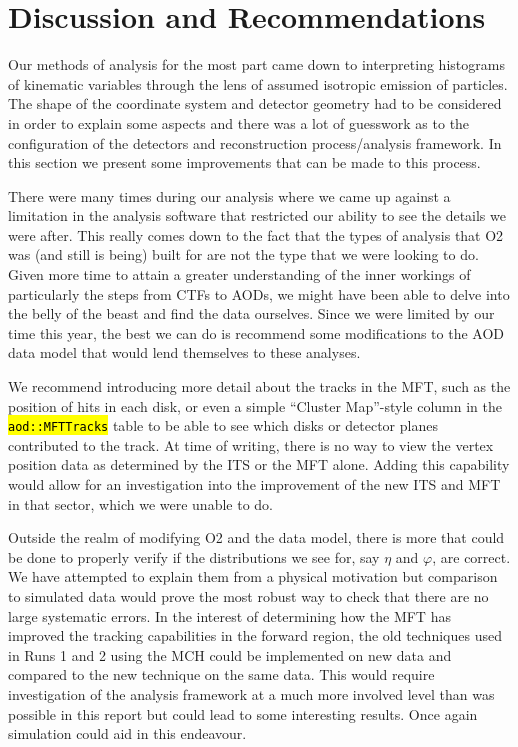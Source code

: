 \documentclass[11pt]{article}
\numberwithin{equation}{section}
\numberwithin{figure}{section}
\numberwithin{table}{section}
\let\OldTexttt\texttt
\renewcommand{\texttt}[1]{\OldTexttt{\hl{#1}}}
\begin{document}
\section{Discussion and Recommendations}\label{sec:DiscussionRecommendations}
Our methods of analysis for the most part came down to interpreting histograms of kinematic variables through the lens of assumed isotropic emission of particles. The shape of the coordinate system and detector geometry had to be considered in order to explain some aspects and there was a lot of guesswork as to the configuration of the detectors and reconstruction process/analysis framework. In this section we present some improvements that can be made to this process.

There were many times during our analysis where we came up against a limitation in the analysis software that restricted our ability to see the details we were after. This really comes down to the fact that the types of analysis that O2 was (and still is being) built for are not the type that we were looking to do. Given more time to attain a greater understanding of the inner workings of particularly the steps from CTFs to AODs, we might have been able to delve into the belly of the beast and find the data ourselves. Since we were limited by our time this year, the best we can do is recommend some modifications to the AOD data model that would lend themselves to these analyses. 

We recommend introducing more detail about the tracks in the MFT, such as the position of hits in each disk, or even a simple ``Cluster Map''-style column in the \texttt{aod::MFTTracks} table to be able to see which disks or detector planes contributed to the track. At time of writing, there is no way to view the vertex position data as determined by the ITS or the MFT alone. Adding this capability would allow for an investigation into the improvement of the new ITS and MFT in that sector, which we were unable to do.

Outside the realm of modifying O2 and the data model, there is more that could be done to properly verify if the distributions we see for, say $\eta$ and $\varphi$, are correct. We have attempted to explain them from a physical motivation but comparison to simulated data would prove the most robust way to check that there are no large systematic errors. In the interest of determining how the MFT has improved the tracking capabilities in the forward region, the old techniques used in Runs 1 and 2 using the MCH could be implemented on new data and compared to the new technique on the same data. This would require investigation of the analysis framework at a much more involved level than was possible in this report but could lead to some interesting results. Once again simulation could aid in this endeavour. 
\end{document}
